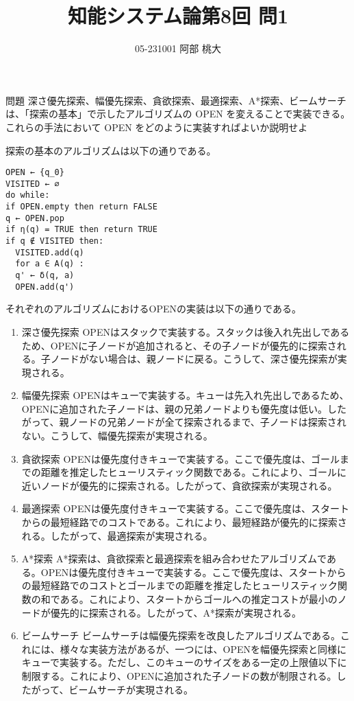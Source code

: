 \documentclass[a4paper,11pt]{ltjsarticle}
\begin{document}
\title{知能システム論第8回 問1}
\author{ 05-231001 阿部 桃大}
\maketitle

\begin{itembox}[l]{問題}
  深さ優先探索、幅優先探索、貪欲探索、最適探索、A*探索、ビームサーチは、「探索の基本」で⽰したアルゴリズムの OPEN を変えることで実装できる。\newline
  これらの⼿法において OPEN をどのように実装すればよいか説明せよ
\end{itembox}
探索の基本のアルゴリズムは以下の通りである。

\begin{verbatim}
OPEN ← {q_0}
VISITED ← ∅
do while:
if OPEN.empty then return FALSE
q ← OPEN.pop
if η(q) = TRUE then return TRUE
if q ∉ VISITED then:
  VISITED.add(q)
  for a ∈ A(q) :
  q' ← δ(q, a)
  OPEN.add(q')
\end{verbatim}

それぞれのアルゴリズムにおけるOPENの実装は以下の通りである。

\begin{enumerate}
  \item 深さ優先探索 \newline
        OPENはスタックで実装する。スタックは後入れ先出しであるため、OPENに子ノードが追加されると、その子ノードが優先的に探索される。子ノードがない場合は、親ノードに戻る。こうして、深さ優先探索が実現される。
  \item 幅優先探索 \newline
        OPENはキューで実装する。キューは先入れ先出しであるため、OPENに追加された子ノードは、親の兄弟ノードよりも優先度は低い。したがって、親ノードの兄弟ノードが全て探索されるまで、子ノードは探索されない。こうして、幅優先探索が実現される。
  \item 貪欲探索 \newline
        OPENは優先度付きキューで実装する。ここで優先度は、ゴールまでの距離を推定したヒューリスティック関数である。これにより、ゴールに近いノードが優先的に探索される。したがって、貪欲探索が実現される。
  \item 最適探索 \newline
        OPENは優先度付きキューで実装する。ここで優先度は、スタートからの最短経路でのコストである。これにより、最短経路が優先的に探索される。したがって、最適探索が実現される。
  \item A*探索\newline
        A*探索は、貪欲探索と最適探索を組み合わせたアルゴリズムである。OPENは優先度付きキューで実装する。ここで優先度は、スタートからの最短経路でのコストとゴールまでの距離を推定したヒューリスティック関数の和である。これにより、スタートからゴールへの推定コストが最小のノードが優先的に探索される。したがって、A*探索が実現される。
  \item ビームサーチ\newline
        ビームサーチは幅優先探索を改良したアルゴリズムである。これには、様々な実装方法があるが、一つには、OPENを幅優先探索と同様にキューで実装する。ただし、このキューのサイズをある一定の上限値以下に制限する。これにより、OPENに追加された子ノードの数が制限される。したがって、ビームサーチが実現される。
\end{enumerate}
\end{document}

